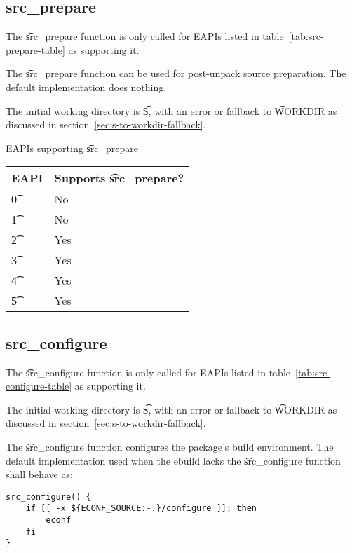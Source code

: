 \subsection{src\_prepare}
\label{sec:src-prepare-function}

 The \t{src\_prepare} function is only called for EAPIs listed in
table~\ref{tab:src-prepare-table} as supporting it.

The \t{src\_prepare} function can be used for post-unpack source preparation. The default
implementation does nothing.

The initial working directory is \t{S}, with an error or fallback to \t{WORKDIR} as discussed in
section~\ref{sec:s-to-workdir-fallback}.

\begin{centertable}{EAPIs supporting \t{src\_prepare}} \label{tab:src-prepare-table}
    \begin{tabular}{ l l }
        \toprule
        \multicolumn{1}{c}{\textbf{EAPI}} &
        \multicolumn{1}{c}{\textbf{Supports \t{src\_prepare}?}} \\
        \midrule
    \t{0} & No \\
    \t{1} & No \\
    \t{2} & Yes \\
    \t{3} & Yes \\
    \t{4} & Yes \\
    \t{5} & Yes \\
    \bottomrule
    \end{tabular}
\end{centertable}

\subsection{src\_configure}
\label{sec:src-configure-function}

 The \t{src\_configure} function is only called for EAPIs listed in
table~\ref{tab:src-configure-table} as supporting it.

The initial working directory is \t{S}, with an error or fallback to \t{WORKDIR} as discussed in
section~\ref{sec:s-to-workdir-fallback}.

The \t{src\_configure} function configures the package's build environment. The default
implementation used when the ebuild lacks the \t{src\_configure} function shall behave as:

\begin{verbatim}
src_configure() {
    if [[ -x ${ECONF_SOURCE:-.}/configure ]]; then
        econf
    fi
}
\end{verbatim}

